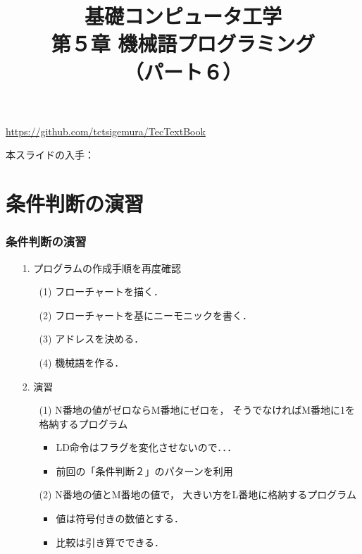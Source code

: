 \documentclass[handout]{beamer}        %
\begin{document}
\title{基礎コンピュータ工学\\第５章 機械語プログラミング\\（パート６）}
\date{}

\begin{frame}
  \titlepage
  \centerline{\url{https://github.com/tctsigemura/TecTextBook}}
  \vfill
  \centerline{本スライドの入手：
    }
\end{frame}


\section{条件判断の演習}
\begin{frame}
  \frametitle{条件判断の演習}
  \begin{enumerate}
  \item[1.] プログラムの作成手順を再度確認
    \begin{enumerate}
    \item[(1)] フローチャートを描く．
    \item[(2)] フローチャートを基にニーモニックを書く．
    \item[(3)] アドレスを決める．
    \item[(4)] 機械語を作る．
    \end{enumerate}
    \vfill
  \item[2.] 演習
    \begin{enumerate}
    \item[(1)] N番地の値がゼロならM番地にゼロを，
      そうでなければM番地に1を格納するプログラム
      \begin{itemize}
      \item LD命令はフラグを変化させないので．．．
      \item 前回の「条件判断２」のパターンを利用
      \end{itemize}
      \vfill
    \item[(2)] N番地の値とM番地の値で，
      大きい方をL番地に格納するプログラム
      \begin{itemize}
      \item 値は符号付きの数値とする．
      \item 比較は引き算でできる．
      \end{itemize}
    \end{enumerate}
  \end{enumerate}
  \vfill
\end{frame}
\end{document}
